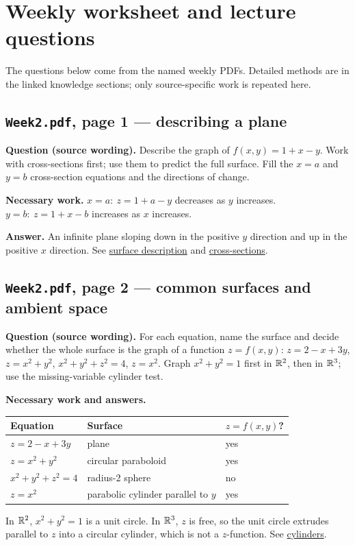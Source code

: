 \section{Weekly worksheet and lecture questions}\label{weekly}
The questions below come from the named weekly PDFs. Detailed methods are in the linked knowledge sections; only source-specific work is repeated here.

\subsection{\texttt{Week2.pdf}, page 1 --- describing a plane}
\textbf{Question (source wording).} Describe the graph of $f(x,y)=1+x-y$. Work with cross-sections first; use them to predict the full surface. Fill the $x=a$ and $y=b$ cross-section equations and the directions of change.\par
\textbf{Necessary work.} $x=a:\ z=1+a-y$ decreases as $y$ increases. $y=b:\ z=1+x-b$ increases as $x$ increases.\par
\textbf{Answer.} An infinite plane sloping down in the positive $y$ direction and up in the positive $x$ direction. See \hyperref[surface]{surface description} and \hyperref[cross]{cross-sections}.

\subsection{\texttt{Week2.pdf}, page 2 --- common surfaces and ambient space}
\textbf{Question (source wording).} For each equation, name the surface and decide whether the whole surface is the graph of a function $z=f(x,y)$: $z=2-x+3y$, $z=x^2+y^2$, $x^2+y^2+z^2=4$, $z=x^2$. Graph $x^2+y^2=1$ first in $\mathbb R^2$, then in $\mathbb R^3$; use the missing-variable cylinder test.\par
\textbf{Necessary work and answers.}\begin{center}\begin{tabular}{lll}\toprule Equation & Surface & $z=f(x,y)$?\\\midrule $z=2-x+3y$ & plane & yes\\$z=x^2+y^2$&circular paraboloid&yes\\$x^2+y^2+z^2=4$&radius-2 sphere&no\\$z=x^2$&parabolic cylinder parallel to $y$&yes\\\bottomrule\end{tabular}\end{center}
In $\mathbb R^2$, $x^2+y^2=1$ is a unit circle. In $\mathbb R^3$, $z$ is free, so the unit circle extrudes parallel to $z$ into a circular cylinder, which is not a $z$-function. See \hyperref[cylinder]{cylinders}.

